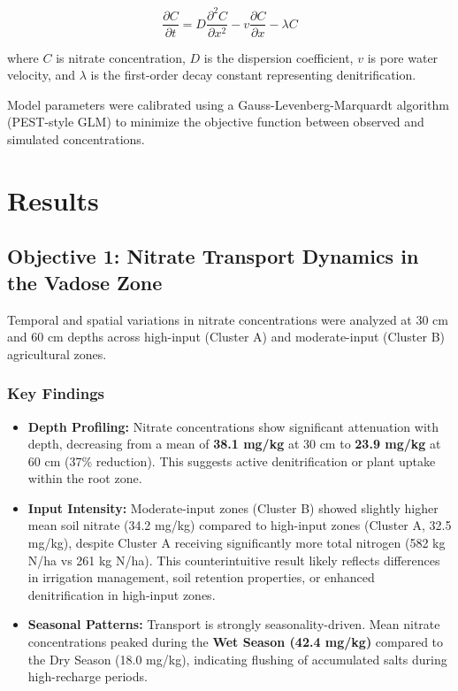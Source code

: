 \documentclass[12pt,a4paper]{article}
\begin{document}
\begin{equation}
\frac{\partial C}{\partial t} = D \frac{\partial^2 C}{\partial x^2} - v \frac{\partial C}{\partial x} - \lambda C
\label{eq:adr}
\end{equation}

where $C$ is nitrate concentration, $D$ is the dispersion coefficient, $v$ is pore water velocity, and $\lambda$ is the first-order decay constant representing denitrification.

Model parameters were calibrated using a Gauss-Levenberg-Marquardt algorithm (PEST-style GLM) \citep{Doherty2015} to minimize the objective function between observed and simulated concentrations.

\section{Results}

\subsection{Objective 1: Nitrate Transport Dynamics in the Vadose Zone}

Temporal and spatial variations in nitrate concentrations were analyzed at 30 cm and 60 cm depths across high-input (Cluster A) and moderate-input (Cluster B) agricultural zones.

\subsubsection{Key Findings}
\begin{itemize}
	\item \textbf{Depth Profiling:} Nitrate concentrations show significant attenuation with depth, decreasing from a mean of \textbf{38.1 mg/kg} at 30 cm to \textbf{23.9 mg/kg} at 60 cm (37\% reduction). This suggests active denitrification or plant uptake within the root zone.
	\item \textbf{Input Intensity:} Moderate-input zones (Cluster B) showed slightly higher mean soil nitrate (34.2 mg/kg) compared to high-input zones (Cluster A, 32.5 mg/kg), despite Cluster A receiving significantly more total nitrogen (582 kg N/ha vs 261 kg N/ha). This counterintuitive result likely reflects differences in irrigation management, soil retention properties, or enhanced denitrification in high-input zones.
	\item \textbf{Seasonal Patterns:} Transport is strongly seasonality-driven. Mean nitrate concentrations peaked during the \textbf{Wet Season (42.4 mg/kg)} compared to the Dry Season (18.0 mg/kg), indicating flushing of accumulated salts during high-recharge periods.
\end{itemize}
\end{document}
